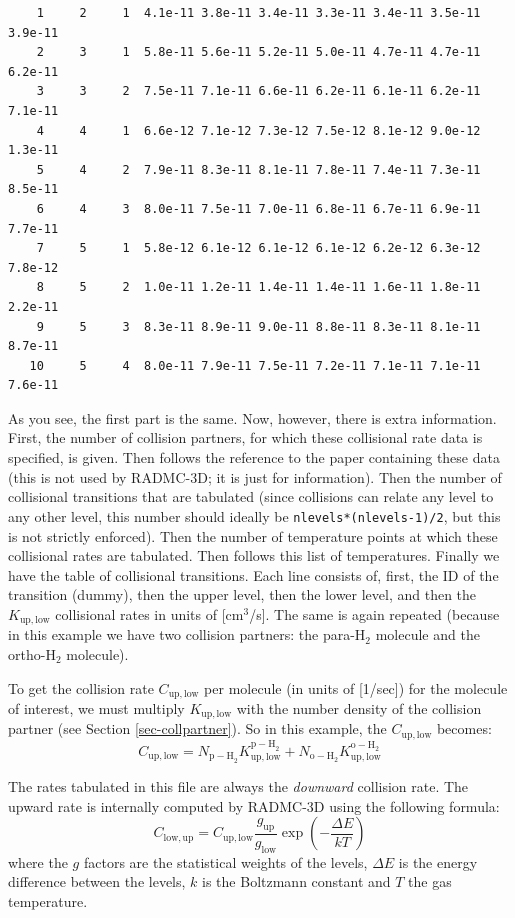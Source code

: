 \documentclass{report}
\newenvironment{asciibox}%
  {\begin{list}{}{%
    \setlength{\topsep}{0.5em}%
    \setlength{\parskip}{0em}%
    \setlength{\parsep}{0em}%
    \setlength{\itemsep}{0em}%
    \setlength{\rightmargin}{0em}%
    \setlength{\leftmargin}{3.0em}%
    \setlength{\labelsep}{1em}%
    \setlength{\labelwidth}{2em}%
  }\normalfont\footnotesize\item}
  {\end{list}}
\begin{document}
\begin{asciibox}
\begin{verbatim}
    1     2     1  4.1e-11 3.8e-11 3.4e-11 3.3e-11 3.4e-11 3.5e-11 3.9e-11 
    2     3     1  5.8e-11 5.6e-11 5.2e-11 5.0e-11 4.7e-11 4.7e-11 6.2e-11 
    3     3     2  7.5e-11 7.1e-11 6.6e-11 6.2e-11 6.1e-11 6.2e-11 7.1e-11 
    4     4     1  6.6e-12 7.1e-12 7.3e-12 7.5e-12 8.1e-12 9.0e-12 1.3e-11 
    5     4     2  7.9e-11 8.3e-11 8.1e-11 7.8e-11 7.4e-11 7.3e-11 8.5e-11 
    6     4     3  8.0e-11 7.5e-11 7.0e-11 6.8e-11 6.7e-11 6.9e-11 7.7e-11 
    7     5     1  5.8e-12 6.1e-12 6.1e-12 6.1e-12 6.2e-12 6.3e-12 7.8e-12 
    8     5     2  1.0e-11 1.2e-11 1.4e-11 1.4e-11 1.6e-11 1.8e-11 2.2e-11 
    9     5     3  8.3e-11 8.9e-11 9.0e-11 8.8e-11 8.3e-11 8.1e-11 8.7e-11 
   10     5     4  8.0e-11 7.9e-11 7.5e-11 7.2e-11 7.1e-11 7.1e-11 7.6e-11 
\end{verbatim}\end{asciibox}
As you see, the first part is the same. Now, however, there is extra
information.  First, the number of collision partners, for which these
collisional rate data is specified, is given. Then follows the reference to
the paper containing these data (this is not used by RADMC-3D; it is just
for information). Then the number of collisional transitions that are
tabulated (since collisions can relate any level to any other level, this
number should ideally be {\small\tt nlevels*(nlevels-1)/2}, but this is not
strictly enforced). Then the number of temperature points at which these
collisional rates are tabulated. Then follows this list of temperatures.
Finally we have the table of collisional transitions. Each line consists of,
first, the ID of the transition (dummy), then the upper level, then the
lower level, and then the $K_{\mathrm{up,low}}$ collisional rates in units
of [cm$^3$/s]. The same is again repeated (because in this example we have
two collision partners: the para-H$_2$ molecule and the ortho-H$_2$
molecule). 

To get the collision rate $C_{\mathrm{up,low}}$ per molecule (in units of
[1/sec]) for the molecule of interest, we must multiply
$K_{\mathrm{up,low}}$ with the number density of the collision partner (see
Section \ref{sec-collpartner}).  So in this example, the
$C_{\mathrm{up,low}}$ becomes:
\begin{equation}
C_{\mathrm{up,low}} = N_{\mathrm{p-H}_2}K^{\mathrm{p-H}_2}_{\mathrm{up,low}}
+ N_{\mathrm{o-H}_2}K^{\mathrm{o-H}_2}_{\mathrm{up,low}}
\end{equation}

The rates tabulated in this file are always the {\em downward} collision
rate. The upward rate is internally computed by RADMC-3D using the following
formula:
\begin{equation}
C_{\mathrm{low,up}} = C_{\mathrm{up,low}} \frac{g_{\mathrm{up}}}{g_{\mathrm{low}}}
\exp\left(-\frac{\Delta E}{kT}\right)
\end{equation}
where the $g$ factors are the statistical weights of the levels, $\Delta E$
is the energy difference between the levels, $k$ is the Boltzmann constant
and $T$ the gas temperature. 
\end{document}
